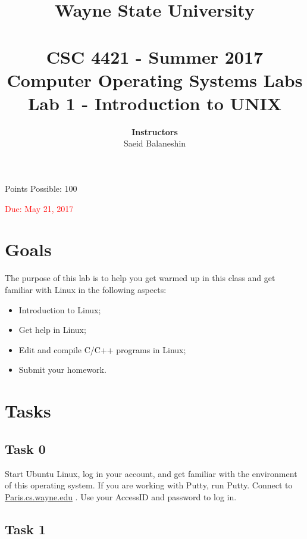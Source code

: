 \documentclass[16pt]{article}
\begin{document}
\title{\huge \textbf{Wayne State University \\
 \vline \\
\Huge CSC 4421 - Summer 2017 \\
 Computer Operating Systems Labs\\
 Lab 1 - Introduction to UNIX}\\
 \vline
 }
\author{\textbf{Instructors}  \vspace{0.2cm} \\ 
Saeid Balaneshin
}
\maketitle

\begin{center}
\Large Points Possible: 100

\textcolor{red}{Due: May 21, 2017}
\end{center}

\section*{Goals}

The purpose of this lab is to help you get warmed up in this class and get familiar with Linux in the following aspects:
\begin{itemize}
\item Introduction to Linux;
\item Get help in Linux;
\item Edit and compile C/C++ programs in Linux;
\item Submit your homework.
\end{itemize}


\section*{Tasks}

\subsection*{Task 0}

Start Ubuntu Linux, log in your account, and get familiar with the environment of this operating system. If you are working with Putty, run Putty. Connect to \url{Paris.cs.wayne.edu} . Use your AccessID and password to log in.

\subsection*{Task 1}
\end{document}
